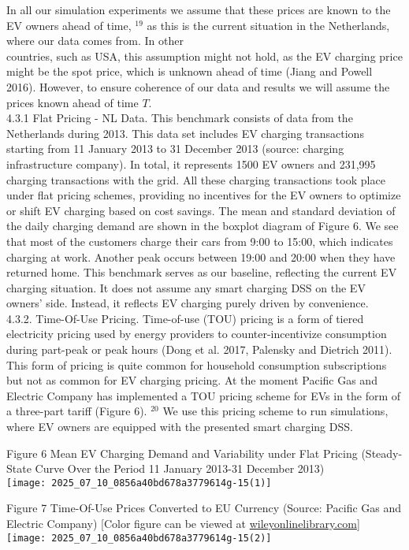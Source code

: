 \documentclass[10pt]{article}
\begin{document}
In all our simulation experiments we assume that these prices are known to the EV owners ahead of time, ${ }^{19}$ as this is the current situation in the Netherlands, where our data comes from. In other\\
countries, such as USA, this assumption might not hold, as the EV charging price might be the spot price, which is unknown ahead of time (Jiang and Powell 2016). However, to ensure coherence of our data and results we will assume the prices known ahead of time $T$.\\
4.3.1 Flat Pricing - NL Data. This benchmark consists of data from the Netherlands during 2013. This data set includes EV charging transactions starting from 11 January 2013 to 31 December 2013 (source: charging infrastructure company). In total, it represents 1500 EV owners and 231,995 charging transactions with the grid. All these charging transactions took place under flat pricing schemes, providing no incentives for the EV owners to optimize or shift EV charging based on cost savings. The mean and standard deviation of the daily charging demand are shown in the boxplot diagram of Figure 6. We see that most of the customers charge their cars from 9:00 to 15:00, which indicates charging at work. Another peak occurs between 19:00 and 20:00 when they have returned home. This benchmark serves as our baseline, reflecting the current EV charging situation. It does not assume any smart charging DSS on the EV owners' side. Instead, it reflects EV charging purely driven by convenience.\\
4.3.2. Time-Of-Use Pricing. Time-of-use (TOU) pricing is a form of tiered electricity pricing used by energy providers to counter-incentivize consumption during part-peak or peak hours (Dong et al. 2017, Palensky and Dietrich 2011). This form of pricing is quite common for household consumption subscriptions but not as common for EV charging pricing. At the moment Pacific Gas and Electric Company has implemented a TOU pricing scheme for EVs in the form of a three-part tariff (Figure 6). ${ }^{20}$ We use this pricing scheme to run simulations, where EV owners are equipped with the presented smart charging DSS.

Figure 6 Mean EV Charging Demand and Variability under Flat Pricing (Steady-State Curve Over the Period 11 January 2013-31 December 2013)\\
\texttt{[image: 2025\_07\_10\_0856a40bd678a3779614g-15(1)]}

Figure 7 Time-Of-Use Prices Converted to EU Currency (Source: Pacific Gas and Electric Company) [Color figure can be viewed at \href{http://wileyonlinelibrary.com}{wileyonlinelibrary.com}]\\
\texttt{[image: 2025\_07\_10\_0856a40bd678a3779614g-15(2)]}
\end{document}
